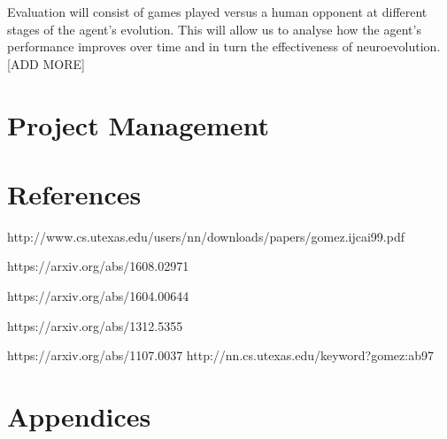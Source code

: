 \documentclass[11pt,a4paper]{article}
\begin{document}
Evaluation will consist of games played versus a human opponent at different stages of the agent's evolution. This will allow us to analyse how the agent's performance improves over time and in turn the effectiveness of neuroevolution.\\

[ADD MORE]

\newpage
\section{Project Management}

\section{References}

http://www.cs.utexas.edu/users/nn/downloads/papers/gomez.ijcai99.pdf

https://arxiv.org/abs/1608.02971

https://arxiv.org/abs/1604.00644

https://arxiv.org/abs/1312.5355

https://arxiv.org/abs/1107.0037
http://nn.cs.utexas.edu/keyword?gomez:ab97
\newpage
\section{Appendices}
\end{document}
